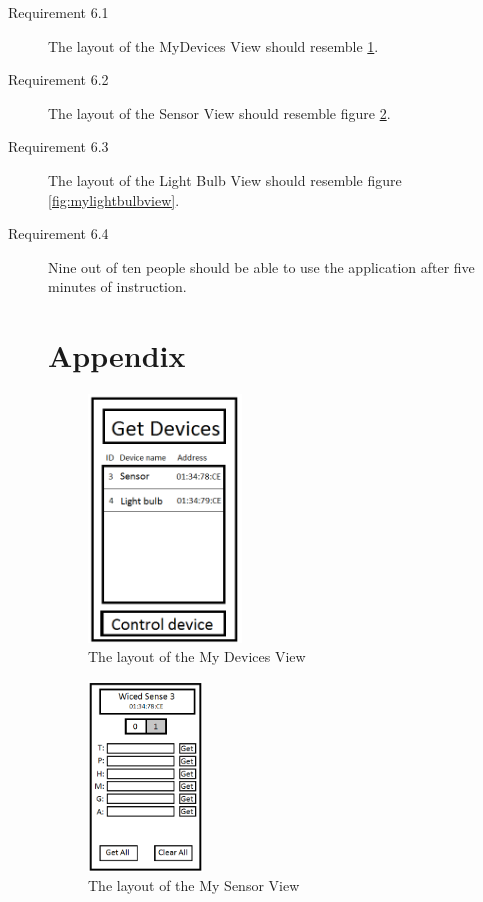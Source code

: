 \documentclass[a4paper]{article}
\begin{document}
\begin{description}
\item[Requirement 6.1] The layout of the MyDevices View should resemble \ref{fig:mydeviceview}.
\item[Requirement 6.2] The layout of the Sensor View should resemble figure \ref{fig:mysensorview}.
\item[Requirement 6.3] The layout of the Light Bulb View should resemble figure \ref{fig:mylightbulbview}.
\item[Requirement 6.4] Nine out of ten people should be able to use the application after five minutes of instruction. 

\section{Appendix}

\begin{figure}[H]
    \centering
    \includegraphics[width=0.4\textwidth]{pic1.png}
    \caption{The layout of the My Devices View}
    \label{fig:mydeviceview}
\end{figure}

\begin{figure}[H]
    \centering
    \includegraphics[width=0.3\textwidth]{pic2.png}
    \caption{The layout of the My Sensor View}
    \label{fig:mysensorview}
\end{figure}


\end{description}
\end{document}
